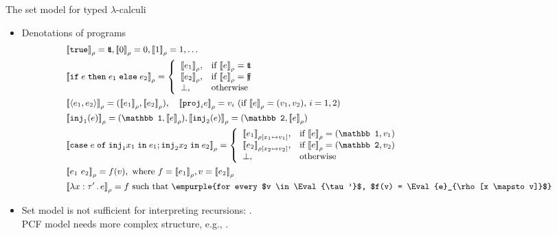 \documentclass[paper=screen,mode=present,style=zysimple]{powerdot}
\begin{document}
\begin{slide}{The set model for typed $\lambda$-calculi}
\begin{itemize}
\item Denotations of programs
\[\small
\begin{array}{l}
\Eval{\ctrue}_\rho = \vtt, 
\Eval{0}_\rho = 0, \Eval 1_\rho = 1, \ldots 
\\[0.5em]
\Eval{\cif{e}{e_1}{e_2}}_\rho = \left \{
\begin{array}{l@{\quad}l}
\Eval{e_1}_\rho, & \mbox{if $\Eval e_\rho = \vtt$} \\
\Eval{e_2}_\rho, & \mbox{if $\Eval e_\rho = \vff$} \\
\bot, & \mbox{otherwise}
\end{array} 
\right . 
\\[1.8em]
\Eval{\cpair{e_1, e_2}}_\rho = (\Eval{e_1}_\rho, \Eval{e_2}_\rho), \quad
\Eval{\cproj_i e}_\rho = v_i \mbox{ (if $\Eval{e}_\rho = (v_1, v_2)$, $i = 1, 2$)}
\\[0.5em]
\Eval{\cinj_1(e)}_\rho = (\mathbb 1, \Eval{e}_\rho) ,
\Eval{\cinj_2(e)}_\rho = (\mathbb 2, \Eval{e}_\rho) 
\\[0.5em]
\Eval{\mathtt{case} \; e \; \mathtt{of} \; \cinj_1 x_1 \; \mathtt{in} \; e_1 ; \cinj_2 x_2 \; \mathtt{in} \; e_2}_\rho = 
\left \{
\begin{array}{l@{\quad}l}
\Eval{e_1}_{\rho[x_1 \mapsto v_1]}, & \mbox{if $\Eval e_\rho = (\mathbb 1, v_1)$} \\
\Eval{e_2}_{\rho[x_2 \mapsto v_2]}, & \mbox{if $\Eval e_\rho = (\mathbb 2, v_2)$} \\
\bot, & \mbox{otherwise}
\end{array} 
\right . 
\\[1.8em]
\Eval{e_1 \ e_2}_\rho = f(v), \mbox{ where $f = \Eval{e_1}_\rho, v = \Eval{e_2}_\rho$}
\\[0.5em]
\Eval{\lambda x : \tau' \ldot e}_\rho = f 
\mbox{ such that \empurple{for every $v \in \Eval{\tau'}$, $f(v) = \Eval{e}_{\rho[x \mapsto v]}$}}
\end{array}
\vspace*{-1.5em}
\]
\item Set model is not sufficient for interpreting recursions: .
\\
PCF model needs more complex structure, e.g.,  . 
\end{itemize}
\end{slide}
\end{document}
